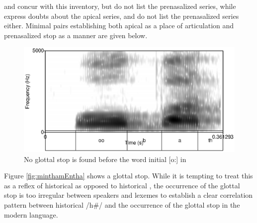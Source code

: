 

\citet{Bichsel} and \citet{Adelaar1991} concur with this inventory, but do not list the prenasalized series, while \citet{SmithEtAl2004} express doubts about the apical series, and do not list the prenasalized series either. Minimal pairs establishing both apical as a place of articulation and prenasalized stop as a manner are given below.

\begin{figure}
	\centering
		\includegraphics{pics/oobath.eps}
	\caption[Absence of a glottal stop before vocalic onset]{No glottal stop is found before the word initial [o:] in }
	\label{fig:phon:oobath}
\end{figure}
  Figure \ref{fig:minthamEntha} shows a glottal stop. While it is tempting to treat this as a reflex of historical  as opposed to historical , the occurrence of the glottal stop is too irregular between speakers and lexemes to establish a clear correlation pattern between historical /h\#/ and the occurrence of the glottal stop in the modern language.

